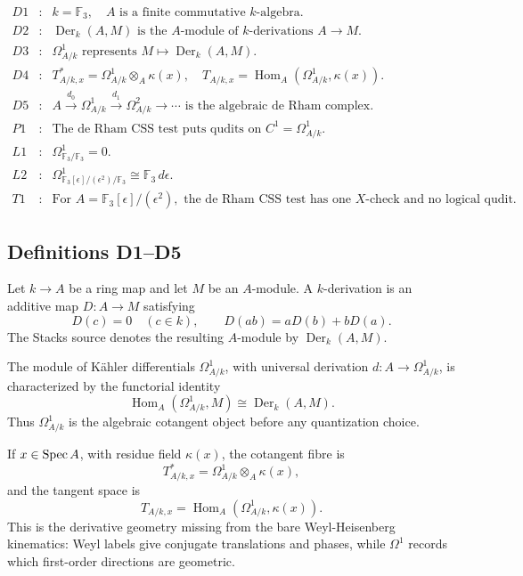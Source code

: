 \[
\begin{array}{rcl}
D1&:&k=\mathbb F_3,\quad A\text{ is a finite commutative }k\text{-algebra}.\\
D2&:&\operatorname{Der}_k(A,M)\text{ is the }A\text{-module of }
      k\text{-derivations }A\to M.\\
D3&:&\Omega^1_{A/k}\text{ represents }M\mapsto\operatorname{Der}_k(A,M).\\
D4&:&T^*_{A/k,x}=\Omega^1_{A/k}\otimes_A\kappa(x),\quad
      T_{A/k,x}=\operatorname{Hom}_A(\Omega^1_{A/k},\kappa(x)).\\
D5&:&A\xrightarrow{d_0}\Omega^1_{A/k}\xrightarrow{d_1}
      \Omega^2_{A/k}\to\cdots\text{ is the algebraic de Rham complex.}\\
P1&:&\text{The de Rham CSS test puts qudits on }C^1=\Omega^1_{A/k}.\\
L1&:&\Omega^1_{\mathbb F_3/\mathbb F_3}=0.\\
L2&:&\Omega^1_{\mathbb F_3[\epsilon]/(\epsilon^2)/\mathbb F_3}
      \cong \mathbb F_3\,d\epsilon.\\
T1&:&\text{For }A=\mathbb F_3[\epsilon]/(\epsilon^2),\text{ the de Rham CSS}
      \text{ test has one }X\text{-check and no logical qudit.}
\end{array}
\]

\subsection{Definitions D1--D5}

Let \(k\to A\) be a ring map and let \(M\) be an \(A\)-module.  A
\(k\)-derivation is an additive map \(D:A\to M\) satisfying
\[
  D(c)=0\quad(c\in k),\qquad
  D(ab)=aD(b)+bD(a).
\]
The Stacks source denotes the resulting \(A\)-module by
\(\operatorname{Der}_k(A,M)\).

The module of Kähler differentials \(\Omega^1_{A/k}\), with universal
derivation \(d:A\to\Omega^1_{A/k}\), is characterized by the functorial
identity
\[
  \operatorname{Hom}_A(\Omega^1_{A/k},M)
  \cong
  \operatorname{Der}_k(A,M).
\]
Thus \(\Omega^1_{A/k}\) is the algebraic cotangent object before any
quantization choice.

If \(x\in\operatorname{Spec} A\), with residue field \(\kappa(x)\), the cotangent fibre is
\[
  T^*_{A/k,x}=\Omega^1_{A/k}\otimes_A\kappa(x),
\]
and the tangent space is
\[
  T_{A/k,x}=\operatorname{Hom}_A(\Omega^1_{A/k},\kappa(x)).
\]
This is the derivative geometry missing from the bare Weyl-Heisenberg
kinematics: Weyl labels give conjugate translations and phases, while
\(\Omega^1\) records which first-order directions are geometric.

